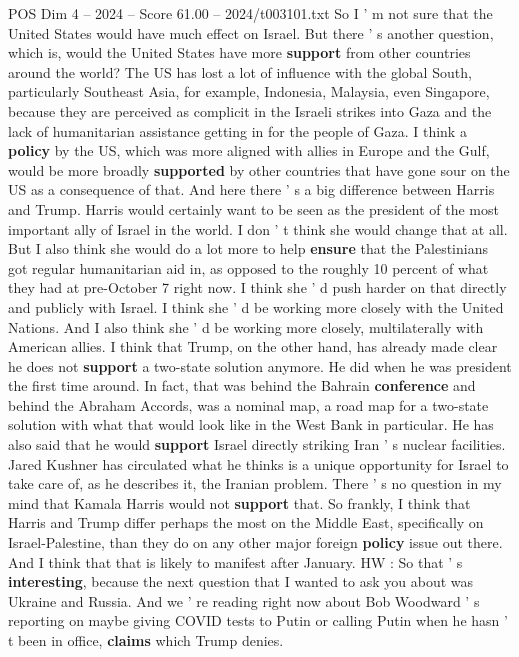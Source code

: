 \begin{textsample}{POS Dim 4 – 2024 – Score 61.00 – 2024/t003101.txt}
So I ' m not sure that the United States would have much effect on Israel.
But there ' s another question, which is, would the United States have more \textbf{support} from other countries around the world?
The US has lost a lot of influence with the global South, particularly Southeast Asia, for example, Indonesia, Malaysia, even Singapore, because they are perceived as complicit in the Israeli strikes into Gaza and the lack of humanitarian assistance getting in for the people of Gaza.
I think a \textbf{policy} by the US, which was more aligned with allies in Europe and the Gulf, would be more broadly \textbf{supported} by other countries that have gone sour on the US as a consequence of that.
And here there ' s a big difference between Harris and Trump.
Harris would certainly want to be seen as the president of the most important ally of Israel in the world.
I don ' t think she would change that at all.
But I also think she would do a lot more to help \textbf{ensure} that the Palestinians got regular humanitarian aid in, as opposed to the roughly 10 percent of what they had at pre-October 7 right now.
I think she ' d push harder on that directly and publicly with Israel.
I think she ' d be working more closely with the United Nations.
And I also think she ' d be working more closely, multilaterally with American allies.
I think that Trump, on the other hand, has already made clear he does not \textbf{support} a two-state solution anymore.
He did when he was president the first time around.
In fact, that was behind the Bahrain \textbf{conference} and behind the Abraham Accords, was a nominal map, a road map for a two-state solution with what that would look like in the West Bank in particular.
He has also said that he would \textbf{support} Israel directly striking Iran ' s nuclear facilities.
Jared Kushner has circulated what he thinks is a unique opportunity for Israel to take care of, as he describes it, the Iranian problem.
There ' s no question in my mind that Kamala Harris would not \textbf{support} that.
So frankly, I think that Harris and Trump differ perhaps the most on the Middle East, specifically on Israel-Palestine, than they do on any other major foreign \textbf{policy} issue out there.
And I think that that is likely to manifest after January.
HW : So that ' s \textbf{interesting}, because the next question that I wanted to ask you about was Ukraine and Russia.
And we ' re reading right now about Bob Woodward ' s reporting on maybe giving COVID tests to Putin or calling Putin when he hasn ' t been in office, \textbf{claims} which Trump denies.

\end{textsample}
